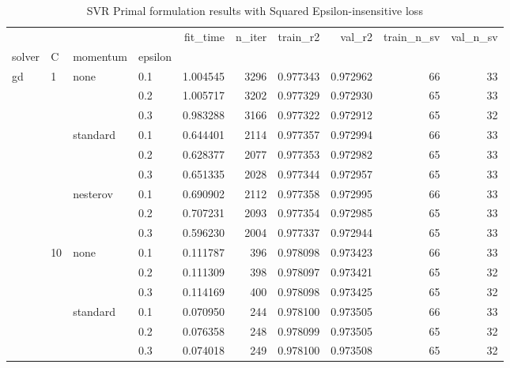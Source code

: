 \begin{table}[H]
\centering
\caption{SVR Primal formulation results with Squared Epsilon-insensitive loss}
\label{primal_svr_squared_eps_cv_results}
\begin{tabular}{llllrrrrrr}
\toprule
          &     &   &     &  fit\_time &  n\_iter &  train\_r2 &    val\_r2 &  train\_n\_sv &  val\_n\_sv \\
solver & C & momentum & epsilon &           &         &           &           &             &           \\
\midrule
gd & 1   & none & 0.1 &  1.004545 &    3296 &  0.977343 &  0.972962 &          66 &        33 \\
          &     &   & 0.2 &  1.005717 &    3202 &  0.977329 &  0.972930 &          65 &        33 \\
          &     &   & 0.3 &  0.983288 &    3166 &  0.977322 &  0.972912 &          65 &        32 \\
          &     & standard & 0.1 &  0.644401 &    2114 &  0.977357 &  0.972994 &          66 &        33 \\
          &     &   & 0.2 &  0.628377 &    2077 &  0.977353 &  0.972982 &          65 &        33 \\
          &     &   & 0.3 &  0.651335 &    2028 &  0.977344 &  0.972957 &          65 &        33 \\
          &     & nesterov & 0.1 &  0.690902 &    2112 &  0.977358 &  0.972995 &          66 &        33 \\
          &     &   & 0.2 &  0.707231 &    2093 &  0.977354 &  0.972985 &          65 &        33 \\
          &     &   & 0.3 &  0.596230 &    2004 &  0.977337 &  0.972944 &          65 &        33 \\
          & 10  & none & 0.1 &  0.111787 &     396 &  0.978098 &  0.973423 &          66 &        33 \\
          &     &   & 0.2 &  0.111309 &     398 &  0.978097 &  0.973421 &          65 &        32 \\
          &     &   & 0.3 &  0.114169 &     400 &  0.978098 &  0.973425 &          65 &        32 \\
          &     & standard & 0.1 &  0.070950 &     244 &  0.978100 &  0.973505 &          66 &        33 \\
          &     &   & 0.2 &  0.076358 &     248 &  0.978099 &  0.973505 &          65 &        32 \\
          &     &   & 0.3 &  0.074018 &     249 &  0.978100 &  0.973508 &          65 &        32 \\

\end{tabular}
\end{table}
